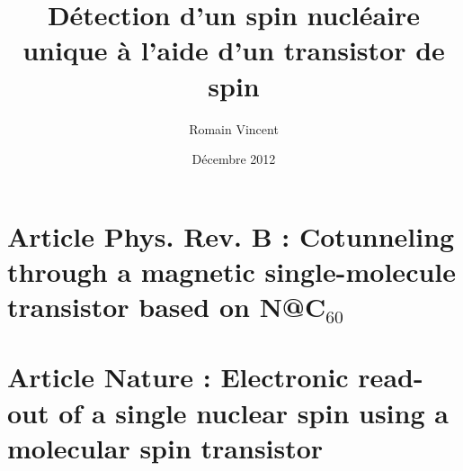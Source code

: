 \documentclass[a4paper,12pt]{book}
\begin{document}
\frontmatter 

\author{Romain Vincent} 
\title{\Huge Détection d'un spin nucléaire unique à l'aide d'un transistor de spin} 
\date{Décembre 2012}
\maketitle
\thispagestyle{empty}
\sloppy %

\tableofcontents

\mainmatter 









\appendix
%



\chapter{Article Phys. Rev. B : Cotunneling through a magnetic single-molecule transistor based on N@C$_{60}$}



\chapter{Article Nature : Electronic read-out of a single nuclear spin using a molecular spin transistor}




\end{document}
